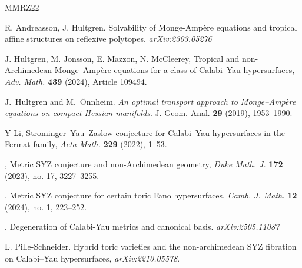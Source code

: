 \documentclass{article}
\begin{document}
\begin{thebibliography}{MMRZ22}

 R. Andreasson, J. Hultgren. Solvability of Monge-Ampère equations and tropical affine structures on reflexive polytopes. \emph{arXiv:2303.05276}

 J. Hultgren, M. Jonsson, E. Mazzon, N. McCleerey, Tropical and non-Archimedean Monge--Ampère equations for a class of Calabi--Yau hypersurfaces, \textit{Adv. Math.} \textbf{439} (2024), Article 109494.

J.~Hultgren and M.~\"Onnheim.
\newblock \emph{An optimal transport approach to Monge--Amp\`ere equations on compact Hessian manifolds}.
\newblock J. Geom. Anal. \textbf{29} (2019), 1953--1990.

Y Li, Strominger--Yau--Zaslow conjecture for Calabi--Yau hypersurfaces in the Fermat family, \textit{Acta Math.} \textbf{229} (2022), 1--53.

\underline{\hspace{1.5cm}}, Metric SYZ conjecture and non-Archimedean geometry, \textit{Duke Math. J.} \textbf{172} (2023), no. 17, 3227--3255.

 \underline{\hspace{1.5cm}}, Metric SYZ conjecture for certain toric Fano hypersurfaces, \textit{Camb. J. Math.} \textbf{12} (2024), no. 1, 223--252.

 \underline{\hspace{1.5cm}}, Degeneration of Calabi-Yau metrics and canonical basis. \emph{arXiv:2505.11087}

 L. Pille-Schneider. Hybrid toric varieties and the non-archimedean SYZ fibration on Calabi--Yau hypersurfaces, \emph{arXiv:2210.05578}.

\end{thebibliography}
\end{document}
